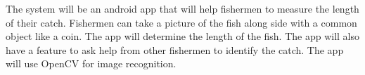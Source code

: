 The system will be an android app that will help fishermen to measure the length of their catch. Fishermen can take a picture of the fish along side with a common object like a coin. The app will determine the length of the fish. The app will also have a feature to ask help from other fishermen to identify the catch. The app will use OpenCV for image recognition.